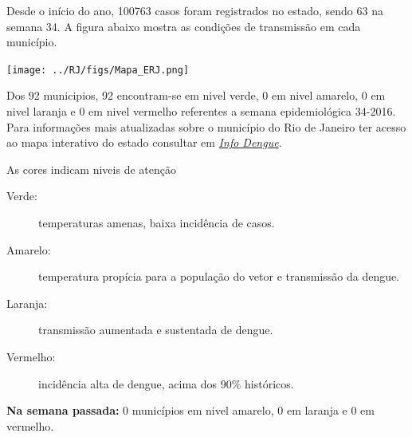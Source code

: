 \documentclass[10pt]{article} %
\begin{document}
\begin{minipage}[t]{.66\linewidth} %

  \hypertarget{estado}{} %

Desde o início do ano, 100763 casos foram registrados no estado, sendo 63 na semana 34. A figura abaixo mostra as condições de transmissão em cada município.

\texttt{[image: ../RJ/figs/Mapa\_ERJ.png]}
  
  Dos 92 municipios, 92 encontram-se em nivel verde, 0 em nivel amarelo, 0 em nivel laranja e 0 em nivel vermelho referentes a semana epidemiológica 34-2016. Para informações mais atualizadas
sobre o município do Rio de Janeiro ter acesso ao mapa interativo do estado consultar em \href{http://info.dengue.mat.br}{\textit{Info Dengue}}.


  \vspace{1cm}
\begin{mdframed}[style=intextbox,frametitle={}] %

\hypertarget{descriptivebox}{} %
As cores indicam niveis de atenção
\begin{description}
\item[Verde:] temperaturas amenas, baixa incidência de casos.      
\item[Amarelo:] temperatura propícia para a população do vetor e transmissão da dengue.
\item[Laranja:] transmissão aumentada e sustentada de dengue. 
\item[Vermelho:] incidência alta de dengue, acima dos 90\% históricos.
\end{description}
\end{mdframed}

\textbf{Na semana passada:} 0 municípios em nivel amarelo, 0 em laranja e 0 em vermelho.  

\end{minipage} %
\end{document}
